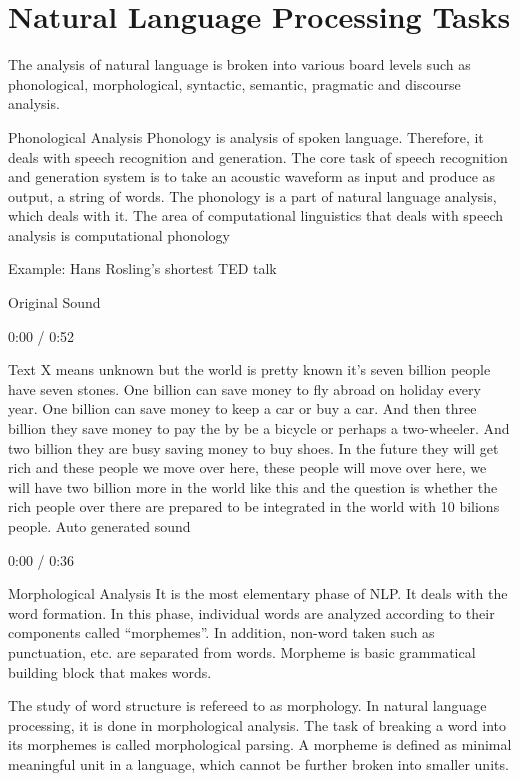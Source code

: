 \section{Natural Language Processing Tasks}

The analysis of natural language is broken into various board levels such as phonological, morphological, syntactic, semantic, pragmatic and discourse analysis.



Phonological Analysis
Phonology is analysis of spoken language. Therefore, it deals with speech recognition and generation. The core task of speech recognition and generation system is to take an acoustic waveform as input and produce as output, a string of words. The phonology is a part of natural language analysis, which deals with it. The area of computational linguistics that deals with speech analysis is computational phonology

Example: Hans Rosling’s shortest TED talk

Original Sound

0:00
/ 0:52



Text	X means unknown but the world is pretty known it’s seven billion people have seven stones. One billion can save money to fly abroad on holiday every year. One billion can save money to keep a car or buy a car. And then three billion they save money to pay the by be a bicycle or perhaps a two-wheeler. And two billion they are busy saving money to buy shoes. In the future they will get rich and these people we move over here, these people will move over here, we will have two billion more in the world like this and the question is whether the rich people over there are prepared to be integrated in the world with 10 bilions people.
Auto generated sound

0:00
/ 0:36



Morphological Analysis
It is the most elementary phase of NLP. It deals with the word formation. In this phase, individual words are analyzed according to their components called “morphemes”. In addition, non-word taken such as punctuation, etc. are separated from words. Morpheme is basic grammatical building block that makes words.



The study of word structure is refereed to as morphology. In natural language processing, it is done in morphological analysis. The task of breaking a word into its morphemes is called morphological parsing. A morpheme is defined as minimal meaningful unit in a language, which cannot be further broken into smaller units.

